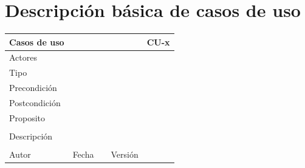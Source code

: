 \documentclass{article}
\begin{document}
\section{Descripción básica de casos de uso}


\begin{table}[h]
\begin{tabular}{|l|l|l|l|l|l|}
\hline
\multicolumn{2}{|p{2cm}|}{Casos de uso}  & \multicolumn{3}{p{7cm}|}{} & CU-x \\
\hline
\multicolumn{2}{|p{2cm}|}{Actores}       & \multicolumn{4}{p{8cm}|}{}        \\
\hline
\multicolumn{2}{|p{2cm}|}{Tipo}          & \multicolumn{4}{p{8cm}|}{}        \\
\hline
\multicolumn{2}{|p{2cm}|}{Precondición}  & \multicolumn{4}{p{8cm}|}{}        \\
\hline
\multicolumn{2}{|p{2cm}|}{Postcondición} & \multicolumn{4}{p{8cm}|}{}        \\
\hline
\multicolumn{6}{|p{10cm}|}{Proposito}                                   \\
\hline
\multicolumn{6}{|p{10cm}|}{}                                            \\
\hline
\multicolumn{6}{|p{10cm}|}{Descripción}                                 \\
\hline
\multicolumn{6}{|p{10cm}|}{}                                            \\
\hline
Autor              &              & Fecha    &     &   Versión  &\\     
\hline
\end{tabular}
\end{table}
\end{document}
